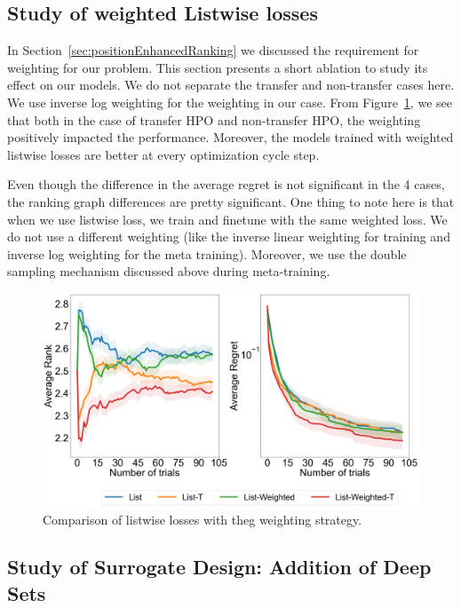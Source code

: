 \documentclass[12pt, twoside, ngerman]{report}
\begin{document}
\subsection{Study of weighted Listwise losses}

In Section~\ref{sec:positionEnhancedRanking} we discussed the requirement for weighting for our problem.
This section presents a short ablation to study its effect on our models.
We do not separate the transfer and non-transfer cases here.
We use inverse log weighting for the weighting in our case.
From Figure~\ref{fig:Q2Ablation}, we see that both in the case of transfer HPO and non-transfer HPO, the weighting positively impacted the performance. Moreover, the models trained with weighted listwise losses are better at every optimization cycle step.

Even though the difference in the average regret is not significant in the 4 cases,  the ranking graph differences are pretty significant. One thing to note here is that when we use listwise loss,  we train and finetune with the same weighted loss. We do not use a different weighting (like the inverse linear weighting for training and inverse log weighting for the meta training). Moreover, we use the double sampling mechanism discussed above during meta-training.

\begin{figure}[h]
  \centering
    \includegraphics[scale=0.25]{images/Q2Ablation}
    \caption{Comparison of listwise losses with theg weighting strategy.}
    \label{fig:Q2Ablation}
\end{figure}


\subsection{Study of Surrogate Design: Addition of Deep Sets}
\end{document}

